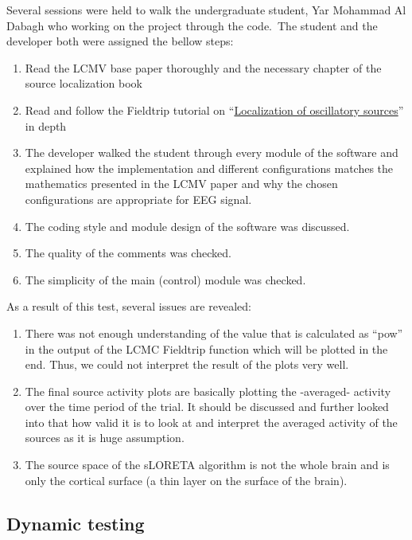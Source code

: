 \documentclass[12pt, titlepage]{article}
\begin{document}
Several sessions were held to walk the undergraduate student, Yar Mohammad Al Dabagh who working on the project through the code.\ The student and the developer both were assigned the bellow steps:

\begin{enumerate} 
	\item Read the LCMV base paper thoroughly and the necessary chapter of the source localization book \cite{veen_1997}
	\item Read and follow the Fieldtrip tutorial on \enquote{\href{https://www.fieldtriptoolbox.org/tutorial/beamformer/}{Localization of oscillatory sources}} in depth 
	\item The developer walked the student through every module of the software and explained how the implementation and different configurations matches the mathematics presented in the LCMV paper and why the chosen configurations are appropriate for EEG signal.
	\item The coding style and module design of the software was discussed.
	\item The quality of the comments was checked. 
	\item The simplicity of the main (control) module was checked.

\end{enumerate}

As a result of this test, several issues are revealed:

\begin{enumerate} 
	\item There was not enough understanding of the value that is calculated as \enquote{pow} in the output of the LCMC Fieldtrip function which will be plotted in the end. Thus, we could not interpret the result of the plots very well.
	\item The final source activity plots are basically plotting the -averaged- activity over the time period of the trial. It should be discussed and further looked into that how valid it is to look at and interpret the averaged activity of the sources as it is huge assumption.
	\item The source space of the sLORETA algorithm is not the whole brain and is only the cortical surface (a thin layer on the surface of the brain).
	
\end{enumerate}

\newpage
\subsection{Dynamic testing}
\end{document}
